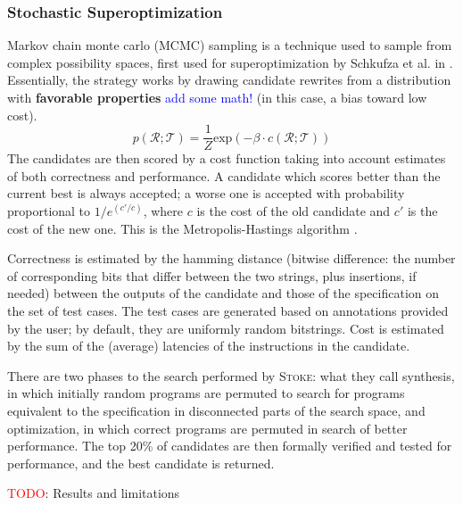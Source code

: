 \documentclass[12pt,twoside]{reedthesis}
\newcommand{\red}[1]{\textcolor{red}{#1}}
\newcommand{\comment}[2]{\textbf{#1} \textcolor{blue}{#2}}
\begin{document}
    \subsubsection{Stochastic Superoptimization}
        Markov chain monte carlo (MCMC) sampling is a technique used to sample from complex possibility spaces, first used for superoptimization by Schkufza et al. in \cite{schkufza2013stoke}.
        Essentially, the strategy works by drawing candidate rewrites from a distribution with \comment{favorable properties}{add some math!} (in this case, a bias toward low cost). %
        \[
            p(\mathcal{R;T}) = \frac{1}{Z} \mathrm{ exp}\left(-\beta \cdot c(\mathcal{R;T})\right)
        \]
        The candidates are then scored by a cost function taking into account estimates of both correctness and performance.
        A candidate which scores better than the current best is always accepted; a worse one is accepted with probability proportional to $1/e^{(c'/c)}$, where $c$ is the cost of the old candidate and $c'$ is the cost of the new one. 
        This is the Metropolis-Hastings algorithm \cite{metropolis1953montecarlo} \cite{hastings1970mcmc}.
            
        Correctness is estimated by the hamming distance (bitwise difference: the number of corresponding bits that differ between the two strings, plus insertions, if needed) between the outputs of the candidate and those of the specification on the set of test cases.
        The test cases are generated based on annotations provided by the user; by default, they are uniformly random bitstrings.
        Cost is estimated by the sum of the (average) latencies of the instructions in the candidate.
            
        There are two phases to the search performed by \textsc{Stoke}:
            what they call synthesis, in which initially random programs are permuted to search for programs equivalent to the specification in disconnected parts of the search space,
            and optimization, in which correct programs are permuted in search of better performance.
        The top 20\% of candidates are then formally verified and tested for performance, and the best candidate is returned.
            
            \red{TODO}: Results and limitations
\end{document}
